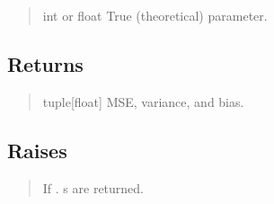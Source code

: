 \documentclass[a4paper,11pt,openany,english]{sphinxmanual}
\begin{document}
\begin{fulllineitems}
\begin{quote}
\begin{description}
\sphinxAtStartPar
int or float
True (theoretical) parameter.

\end{description}\end{quote}


\subsection{Returns}
\label{\detokenize{api_misc:id7}}\begin{quote}\begin{description}
\sphinxAtStartPar
tuple{[}float{]}
MSE, variance, and bias.

\end{description}\end{quote}


\subsection{Raises}
\label{\detokenize{api_misc:id8}}\begin{quote}\begin{description}
\sphinxAtStartPar
If . s are returned.

\end{description}\end{quote}

\end{fulllineitems}
\end{document}
